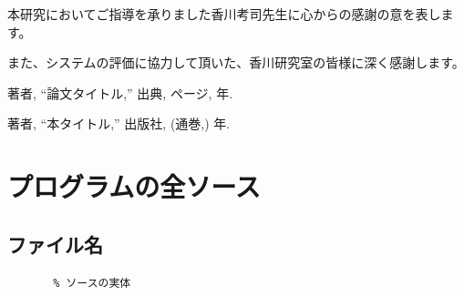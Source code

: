 \documentclass{eniepaper}
\begin{document}
\acknowledgment  %

本研究においてご指導を承りました香川考司先生に心からの感謝の意を表します。

また、システムの評価に協力して頂いた、香川研究室の皆様に深く感謝します。

\begin{thebibliography}{99} %
                                  
 著者,
 ``論文タイトル,'' 出典, ページ, 年.

 著者,
 ``本タイトル,'' 出版社, (通巻,) 年.

\end{thebibliography}

\appendix         %
  \chapter{プログラムの全ソース}

    \section{ファイル名}

    \small
    \begin{verbatim}
       % ソースの実体
    \end{verbatim}

\insertindex %
\printindex
  
\end{document}
